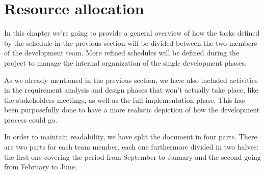 \chapter{Resource allocation}
In this chapter we're going to provide a general overview of how the tasks defined by the schedule in the previous section will be divided between the two members of the development team. More refined schedules will be defined during the project to manage the internal organization of the single development phases.

As we already mentioned in the previous section, we have also included activities in the requirement analysis and design phases that won't actually take place, like the stakeholders meetings, as well as the full implementation phase. This has been purposefully done to have a more realistic depiction of how the development process could go.

In order to maintain readability, we have split the document in four parts. There are two parts for each team member, each one furthermore divided in two halves: the first one covering the period from September to January and the second going from February to June.

